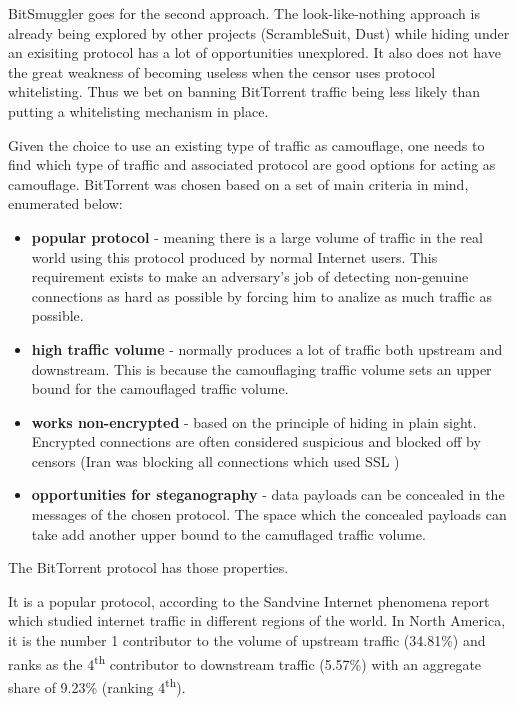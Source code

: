 \documentclass[11pt]{article} %
\newcommand{\projectName}{BitSmuggler }
\begin{document}
\projectName goes for the second approach. The look-like-nothing approach is already being explored by other projects (ScrambleSuit, Dust) while hiding under an exisiting protocol has a lot of opportunities unexplored. It also does not have the great weakness of becoming useless when the censor uses protocol whitelisting. Thus we bet on banning BitTorrent traffic being less likely than putting a whitelisting mechanism in place.

Given the choice to use an existing type of traffic as camouflage, one needs to find which type of traffic and associated protocol are good options for acting as camouflage. BitTorrent was chosen based on a set of main criteria in mind, enumerated below:

\begin{itemize}
\item \textbf{popular protocol} - meaning there is a large volume of traffic in the real world using this protocol produced by normal Internet users. This requirement exists to make an adversary's job of detecting non-genuine connections as hard as possible by forcing him to analize as much traffic as possible.
\item \textbf{high traffic volume} - normally produces a lot of traffic both upstream and downstream. This is because the camouflaging traffic volume sets an upper bound for the camouflaged traffic volume.
\item \textbf{works non-encrypted} - based on the principle of hiding in plain sight. Encrypted connections are often considered suspicious and blocked off by censors (Iran was blocking all connections which used SSL \citep*{web:iranBlocksEncryptedTraffic})
\item \textbf{opportunities for steganography} - data payloads can be concealed in the messages of the chosen protocol. The space which the concealed payloads can take add another upper bound to the camuflaged traffic volume.

\end{itemize}

The BitTorrent protocol has those properties.

It is a popular protocol, according to the Sandvine Internet phenomena report \citep*{web:sandvineInternet} which studied internet traffic in different regions of the world. In North America, it is the number 1 contributor to the volume of upstream traffic (34.81\%) and ranks as the 4\textsuperscript{th} contributor to downstream traffic (5.57\%) with an aggregate share of 9.23\% (ranking 4\textsuperscript{th}).
\end{document}
